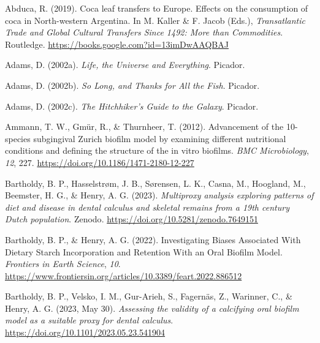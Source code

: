\documentclass[
  letterpaper,
]{book}
\newlength{\cslhangindent}
\newlength{\cslentryspacingunit} %
\newenvironment{CSLReferences}[2] %
 {%
  \setlength{\parindent}{0pt}
  \ifodd #1
  \let\oldpar\par
  \def\par{\hangindent=\cslhangindent\oldpar}
  \fi
  \setlength{\parskip}{#2\cslentryspacingunit}
 }%
 {}
\begin{document}
\hypertarget{refs-11}{}
\begin{CSLReferences}{1}{0}
\leavevmode{}%
Abduca, R. (2019). Coca leaf transfers to {Europe}. {Effects} on the
consumption of coca in {North-western Argentina}. In M. Kaller \& F.
Jacob (Eds.), \emph{Transatlantic {Trade} and {Global Cultural Transfers
Since} 1492: {More} than {Commodities}}. {Routledge}.
\url{https://books.google.com?id=13imDwAAQBAJ}

\leavevmode{}%
Adams, D. (2002a). \emph{Life, the {Universe} and {Everything}}.
{Picador}.

\leavevmode{}%
Adams, D. (2002b). \emph{So {Long}, and {Thanks} for {All} the {Fish}}.
{Picador}.

\leavevmode{}%
Adams, D. (2002c). \emph{The {Hitchhiker}'s {Guide} to the {Galaxy}}.
{Picador}.

\leavevmode{}%
Ammann, T. W., Gmür, R., \& Thurnheer, T. (2012). Advancement of the
10-species subgingival {Zurich} biofilm model by examining different
nutritional conditions and defining the structure of the in vitro
biofilms. \emph{BMC Microbiology}, \emph{12}, 227.
\url{https://doi.org/10.1186/1471-2180-12-227}

\leavevmode{}%
Bartholdy, B. P., Hasselstrøm, J. B., Sørensen, L. K., Casna, M.,
Hoogland, M., Beemster, H. G., \& Henry, A. G. (2023). \emph{Multiproxy
analysis exploring patterns of diet and disease in dental calculus and
skeletal remains from a 19th century {Dutch} population}. {Zenodo}.
\url{https://doi.org/10.5281/zenodo.7649151}

\leavevmode{}%
Bartholdy, B. P., \& Henry, A. G. (2022). Investigating {Biases
Associated With Dietary Starch Incorporation} and {Retention With} an
{Oral Biofilm Model}. \emph{Frontiers in Earth Science}, \emph{10}.
\url{https://www.frontiersin.org/articles/10.3389/feart.2022.886512}

\leavevmode{}%
Bartholdy, B. P., Velsko, I. M., Gur-Arieh, S., Fagernäs, Z., Warinner,
C., \& Henry, A. G. (2023, May 30). \emph{Assessing the validity of a
calcifying oral biofilm model as a suitable proxy for dental calculus}.
\url{https://doi.org/10.1101/2023.05.23.541904}


\end{CSLReferences}
\end{document}
